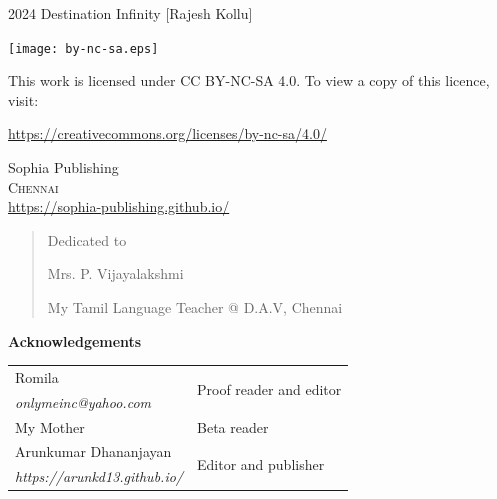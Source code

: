 \begingroup
\footnotesize
\setlength{\parindent}{0pt}
\setlength{\parskip}{\baselineskip}

\textcopyright{} 2024 Destination Infinity [Rajesh Kollu]

\texttt{[image: by-nc-sa.eps]}

This work is licensed under CC BY-NC-SA 4.0. To view a copy of this licence,
visit:

\url{https://creativecommons.org/licenses/by-nc-sa/4.0/}

\vfill

Sophia Publishing \\
\textsc{Chennai} \\
\url{https://sophia-publishing.github.io/} \\
\endgroup

\clearpage

\begin{quote}
\begin{center}Dedicated to

\Large
Mrs. P. Vijayalakshmi
\normalsize

My Tamil Language Teacher @ D.A.V, Chennai
\end{center}
\end{quote}

\vfill

\textbf{Acknowledgements}

\footnotesize
\begin{tabular}{ll}
    Romila & \multirow{2}{*}{Proof reader and editor} \\
    \emph{onlymeinc@yahoo.com} & \\
    My Mother & Beta reader \\
    Arunkumar Dhananjayan & \multirow{2}{*}{Editor and publisher} \\
    \emph{https://arunkd13.github.io/} & \\
\end{tabular}

\clearpage
